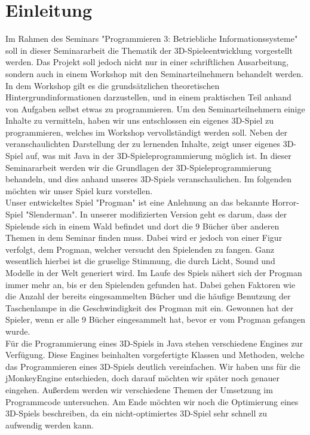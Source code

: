 \chapter{Einleitung}\label{ch:einleitung}
Im Rahmen des Seminars "Programmieren 3: Betriebliche Informationssysteme" soll in dieser Seminararbeit die Thematik der 3D-Spieleentwicklung vorgestellt werden. Das Projekt soll jedoch nicht nur in einer schriftlichen Ausarbeitung, sondern auch in einem Workshop mit den Seminarteilnehmern behandelt werden. In dem Workshop gilt es die grundsätzlichen theoretischen Hintergrundinformationen darzustellen, und in einem praktischen Teil anhand von Aufgaben selbst etwas zu programmieren. Um den Seminarteilnehmern einige Inhalte zu vermitteln, haben wir uns entschlossen ein eigenes 3D-Spiel zu programmieren, welches im Workshop vervollständigt werden soll. Neben der veranschaulichten Darstellung der zu lernenden Inhalte, zeigt unser eigenes 3D-Spiel auf, was mit Java in der 3D-Spieleprogrammierung möglich ist. In dieser Seminararbeit werden wir die Grundlagen der 3D-Spieleprogrammierung behandeln, und dies anhand unseres 3D-Spiels veranschaulichen. Im folgenden möchten wir unser Spiel kurz vorstellen. \\

Unser entwickeltes Spiel "Progman" ist eine Anlehnung an das bekannte Horror-Spiel "Slenderman". In unserer modifizierten Version geht es darum, dass der Spielende sich in einem Wald befindet und dort die 9 Bücher über anderen Themen in dem Seminar finden muss. Dabei wird er jedoch von einer Figur verfolgt, dem Progman, welcher versucht den Spielenden zu fangen. Ganz wesentlich hierbei ist die gruselige Stimmung, die durch Licht, Sound und Modelle in der Welt generiert wird. Im Laufe des Spiels nähert sich der Progman immer mehr an, bis er den Spielenden gefunden hat. Dabei gehen Faktoren wie die Anzahl der bereits eingesammelten Bücher und die häufige Benutzung der Taschenlampe in die Geschwindigkeit des Progman mit ein. Gewonnen hat der Spieler, wenn er alle 9 Bücher eingesammelt hat, bevor er vom Progman gefangen wurde. \\

Für die Programmierung eines 3D-Spiels in Java stehen verschiedene Engines zur Verfügung. Diese Engines beinhalten vorgefertigte Klassen und Methoden, welche das Programmieren eines 3D-Spiels deutlich vereinfachen. Wir haben uns für die jMonkeyEngine entschieden, doch darauf möchten wir später noch genauer eingehen. Außerdem werden wir verschiedene Themen der Umsetzung im Programmcode untersuchen. Am Ende möchten wir noch die Optimierung eines 3D-Spiels beschreiben, da ein nicht-optimiertes 3D-Spiel sehr schnell zu aufwendig werden kann.



